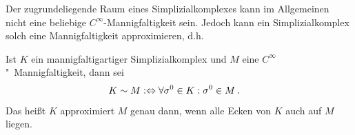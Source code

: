     Der zugrundeliegende Raum eines Simplizialkomplexes kann im Allgemeinen nicht eine beliebige 
    \( C^{\infty} \)-Mannigfaltigkeit sein. Jedoch kann ein Simplizialkomplex solch eine
    Mannigfaltigkeit approximieren, d.h.
    
    \begin{definition}
      \label{defManniApprox}
      Ist \( K \) ein man\-nigfaltigartiger Simplizialkomplex und \( M \) eine \( C^{\infty} \)"~Man\-nigfaltigkeit, dann sei
      \begin{align}
        K \sim M &:\Leftrightarrow \forall \sigma^{0}\in K : \sigma^{0} \in M \,\text{.}
      \end{align}
      Das heißt \( K \) approximiert \( M \) genau dann, wenn alle Ecken von \( K \) auch auf \( M \) liegen.
    \end{definition}

